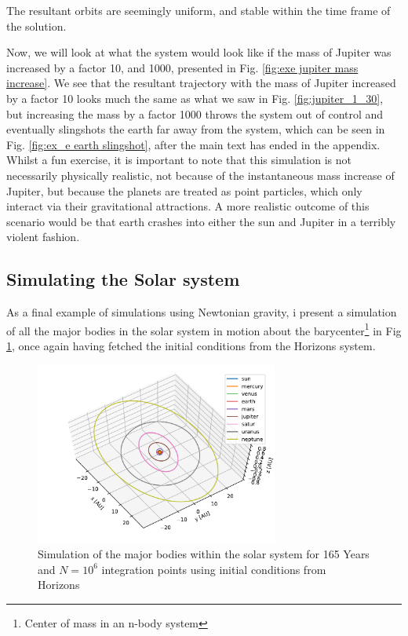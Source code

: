 \documentclass[10pt,showpacs,preprintnumbers,amsmath,amssymb,nofootinbib,aps,prl,twocolumn,groupedaddress,superscriptaddress,showkeys]{revtex4-1}
\begin{document}
  The resultant orbits are seemingly uniform, and stable within the time frame of the solution.

  Now, we will look at what the system would look like if the mass of Jupiter was increased by a factor 10, and 1000, presented in Fig. \ref{fig:exe jupiter mass increase}. We see that the resultant trajectory with the mass of Jupiter increased by a factor 10 looks much the same as what we saw in Fig. \ref{fig:jupiter_1_30}, but increasing the mass by a factor 1000 throws the system out of control and eventually slingshots the earth far away from the system, which can be seen in Fig. \ref{fig:ex_e earth slingshot}, after the main text has ended in the appendix. Whilst a fun exercise, it is important to note that this simulation is not necessarily physically realistic, not because of the instantaneous mass increase of Jupiter, but because the planets are treated as point particles, which only interact via their gravitational attractions. A more realistic outcome of this scenario would be that earth crashes into either the sun and Jupiter in a terribly violent fashion.

\subsection{Simulating the Solar system}
  As a final example of simulations using Newtonian gravity, i present a simulation of all the major bodies in the solar system in motion about the barycenter\footnote{Center of mass in an n-body system} in Fig \ref{fig:solarsystem}, once again having fetched the initial conditions from the Horizons system.

\begin{figure}[h!]
  \center
  \includegraphics[width=8cm]{figs/all_bodies.pdf}
  \caption{Simulation of the major bodies within the solar system for 165 Years and $N=10^6$ integration points using initial conditions from Horizons}
  \label{fig:solarsystem}
\end{figure}
\end{document}
